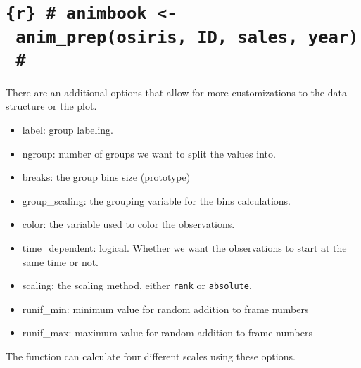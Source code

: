 \hypertarget{r-animbook---anim_preposiris-id-sales-year}{%
\section{\texorpdfstring{\texttt{\{r\}\ \#\ animbook\ \textless{}-\ anim\_prep(osiris,\ ID,\ sales,\ year)\ \#}}{\{r\} \# animbook \textless- anim\_prep(osiris, ID, sales, year) \#}}\label{r-animbook---anim_preposiris-id-sales-year}}

There are an additional options that allow for more customizations to the data structure or the plot.

\begin{itemize}
\tightlist
\item
  label: group labeling.
\item
  ngroup: number of groups we want to split the values into.
\item
  breaks: the group bins size (prototype)
\item
  group\_scaling: the grouping variable for the bins calculations.
\item
  color: the variable used to color the observations.
\item
  time\_dependent: logical. Whether we want the observations to start at the same time or not.
\item
  scaling: the scaling method, either \texttt{rank} or \texttt{absolute}.
\item
  runif\_min: minimum value for random addition to frame numbers
\item
  runif\_max: maximum value for random addition to frame numbers
\end{itemize}

The function can calculate four different scales using these options.

